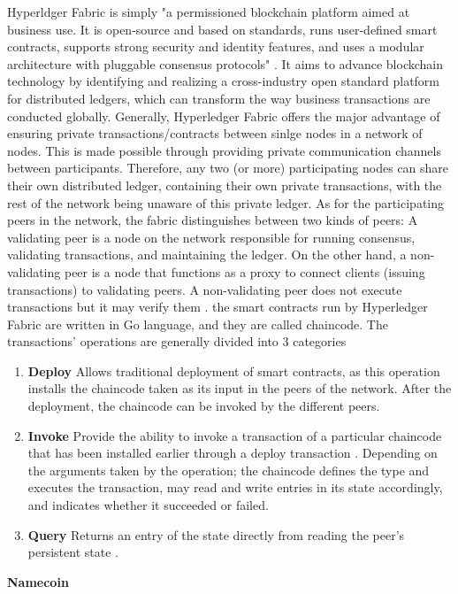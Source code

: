 Hyperldger Fabric is simply "a permissioned blockchain platform aimed at business use. It is open-source and based on standards, runs user-defined smart contracts, supports strong security and identity features, and uses a modular architecture with pluggable consensus protocols" \cite{hyper}. It aims to advance blockchain technology by identifying and realizing a cross-industry open standard platform for distributed ledgers, which can transform the way business transactions are conducted globally. Generally, Hyperledger Fabric offers the major advantage of ensuring private transactions/contracts between sinlge nodes in a network of nodes. This is made possible through providing 
private communication channels between participants. Therefore, any two (or more) participating nodes can share their own distributed ledger, containing their own private transactions, with the rest of the network being unaware of this private ledger. As for the participating peers in the network, the fabric distinguishes between two kinds of peers: A validating peer is a node on the network responsible for running consensus, validating transactions, and maintaining the ledger. On the other hand, a non-validating peer is a node that functions as a proxy to connect clients (issuing transactions) to validating peers. A non-validating peer does not execute transactions but it may verify them \cite{hyper}. the smart contracts run by Hyperledger Fabric are written in Go language, and they are called chaincode. The transactions' operations are generally divided into 3 categories\\
\begin{enumerate}
\item \textbf{Deploy} Allows traditional deployment of smart contracts, as this operation installs the chaincode taken as its input in the peers of the network. After the deployment, the chaincode can be invoked by the different peers.
\item \textbf{Invoke} Provide the ability to invoke a transaction of a particular chaincode that has been installed earlier through a deploy transaction \cite{hyper}. Depending on the arguments taken by the operation; the chaincode defines the type and executes the
transaction, may read and write entries in its state accordingly, and indicates whether it succeeded or
failed.
\item \textbf{Query} Returns an entry of the state directly from reading the peer’s persistent state \cite{hyper}.
\end{enumerate}
\textbf{\large{Namecoin \cite{namecoin}}}\\
